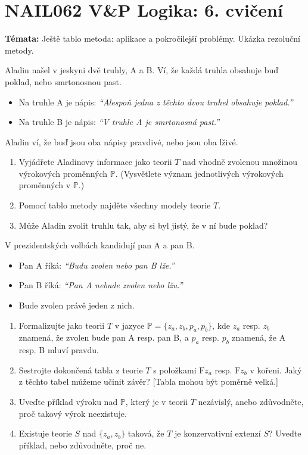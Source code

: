 \documentclass[a4paper,12pt]{article}
\begin{document}
\section*{NAIL062 V\&P Logika: 6. cvičení}


\textbf{Témata:} 
Ještě tablo metoda: aplikace a pokročilejší problémy. Ukázka rezoluční metody.



\medskip\begin{problem}
    Aladin našel v jeskyni dvě truhly, A a B. Ví, že každá truhla obsahuje buď poklad, nebo smrtonosnou past.
    \begin{itemize}
    \item Na truhle A je nápis: {\it ``Alespoň jedna z těchto dvou truhel obsahuje poklad.''}
    \item Na truhle B je nápis: {\it ``V truhle A je smrtonosná past.''}
    \end{itemize}
    Aladin ví, že buď jsou oba nápisy pravdivé, nebo jsou oba lživé.
    \begin{enumerate}
        \item Vyjádřete Aladinovy informace jako teorii $T$ nad vhodně zvolenou množinou výrokových proměnných $\mathbb P$. (Vysvětlete význam jednotlivých výrokových proměnných v $\mathbb P$.)
        \item Pomocí tablo metody najděte všechny modely teorie $T$.
        \item Může Aladin zvolit truhlu tak, aby si byl jistý, že v ní bude poklad?
    \end{enumerate}
    \end{problem}
    
    
    \medskip\begin{problem} %
    V prezidentských volbách kandidují pan A a pan B.
    \begin{itemize}
    \item Pan A říká: {\it ``Budu zvolen nebo pan B lže.''}
    \item Pan B říká: {\it ``Pan A nebude zvolen nebo lžu.''}
    \item Bude zvolen právě jeden z nich.
    \end{itemize}
    \begin{enumerate}
    \item Formalizujte jako teorii $T$ v jazyce $\mathbb P=\{z_a,z_b,p_a,p_b\}$, kde $z_a$ resp. $z_b$ znamená, že zvolen bude pan A resp. pan B, a $p_a$ resp. $p_b$ znamená, že A resp. B mluví pravdu.
    \item Sestrojte dokončená tabla z teorie $T$ s položkami $\mathrm{F}z_a$ resp. $\mathrm{F}z_b$ v kořeni. Jaký z těchto tabel můžeme učinit závěr? [Tabla mohou být poměrně velká.]
    \item Uveďte příklad výroku nad $\mathbb{P}$, který je v teorii $T$ nezávislý, anebo zdůvodněte, proč takový výrok neexistuje.
    \item Existuje teorie $S$ nad $\{z_a,z_b\}$ taková, že $T$ je konzervativní extenzí $S$? Uveďte příklad, nebo zdůvodněte, proč ne.
    \end{enumerate}
    \end{problem}
\end{document}

